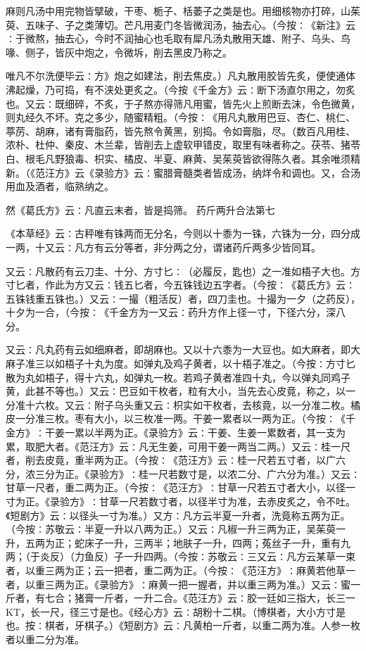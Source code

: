 \documentclass[a4paper,12pt,UTF8,twoside]{ctexbook}
\begin{document}
麻则凡汤中用完物皆擘破，干枣、栀子、栝萎子之类是也。用细核物亦打碎，山茱萸、五味子、子之类薄切。芒凡用麦门冬皆微润汤，抽去心。（今按∶《新注》云∶于微熬，抽去心，今时不润抽心也毛取有犀凡汤丸散用天雄、附子、乌头、鸟喙、侧子，皆灰中炮之，令微坼，削去黑皮乃称之。

唯凡不尔洗便毕云∶方》炮之如建法，削去焦皮。）凡丸散用胶皆先炙，便使通体沸起燥，乃可捣，有不浃处更炙之。（今按《千金方》云∶断下汤直尔用之，勿炙也。又云∶既细碎，不炙，于子熬亦得筛凡用蜜，皆先火上煎断去沫，令色微黄，则丸经久不坏。克之多少，随蜜精粗。（今按∶《用凡丸散用巴豆、杏仁、桃仁、葶苈、胡麻，诸有膏脂药，皆先熬令黄黑，别捣。令如膏脂，尽。（数百凡用桂、浓朴、杜仲、秦皮、木兰辈，皆削去上虚软甲错皮，取里有味者称之。茯苓、猪苓白、根毛凡野狼毒、枳实、橘皮、半夏、麻黄、吴茱萸皆欲得陈久者。其余唯须精新。（《范汪方》云《录验方》云∶蜜腊膏髓类者皆成汤，纳烊令和调也。又，合汤用血及酒者，临熟纳之。

然《葛氏方》云∶凡直云末者，皆是捣筛。
药斤两升合法第七

《本草经》云∶古秤唯有铢两而无分名，今则以十黍为一铢，六铢为一分，四分成一两，十又云∶凡方有云分等者，非分两之分，谓诸药斤两多少皆同耳。

又云∶凡散药有云刀圭、十分、方寸匕∶（必履反，匙也）之一准如梧子大也。方寸匕者，作此为方又云∶钱五匕者，今五铢钱边五字者。（今按∶《葛氏方》云∶五铢钱重五铢也。）又云∶一撮（粗活反）者，四刀圭也。十撮为一夕（之药反），十夕为一合，（今按∶《千金方为一又云∶药升方作上径一寸，下径六分，深八分。

又云∶凡丸药有云如细麻者，即胡麻也。又以十六黍为一大豆也。如大麻者，即大麻子准三以如梧子十丸为度。如弹丸及鸡子黄者，以十梧子准之。（今按∶方寸匕散为丸如梧子，得十六丸，如弹丸一枚。若鸡子黄者准四十丸，今以弹丸同鸡子黄，此甚不等也。）又云∶巴豆如干枚者，粒有大小，当先去心皮竟，称之，以一分准十六枚。又云∶附子乌头重又云∶枳实如干枚者，去核竟，以一分准二枚。橘皮一分准三枚。枣有大小，以三枚准一两。干姜一累者以一两为正。（今按∶《千金方》∶干姜一累以半两为正。《录验方》云∶干姜、生姜一累数者，其一支为累，取肥大者。《范汪方》云∶凡无生姜，可用干姜一两当二两。）又云∶桂一尺者，削去皮竟，重半两为正。（今按∶《范汪方》云∶桂一尺若五寸者，以广六分，浓三分为正。《录验方》∶桂一尺若数寸是，以浓二分、广六分为准。）又云∶甘草一尺者，重二两为正。（今按∶《范汪方》∶甘草一尺若五寸者大小，以径一寸为正。《录验方》∶甘草一尺若数寸者，以径半寸为准，去赤皮炙之，令不吐。《短剧方》云∶以径头一寸为准。）又方∶凡方云半夏一升者，洗竟称五两为正。（今按∶苏敬云∶半夏一升以八两为正。）又云∶凡椒一升三两为正，吴茱萸一升，五两为正；蛇床子一升，三两半；地肤子一升，四两；菟丝子一升，重有九两；（于炎反）（力鱼反）子一升四两。（今按∶苏敬云∶三又云∶凡方云某草一束者，以重三两为正；云一把者，重二两为正。（今按∶《范汪方》∶麻黄若他草一者，以重三两为正。《录验方》∶麻黄一把一握者，并以重三两为准。）又云∶蜜一斤者，有七合；猪膏一斤者，一升二合。《范汪方》云∶胶一廷如三指大，长三一KT，长一尺，径三寸是也。《经心方》云∶胡粉十二棋。（博棋者，大小方寸是也。按∶棋者，牙棋子。）《短剧方》云∶凡黄柏一斤者，以重二两为准。人参一枚者以重二分为准。
\end{document}
